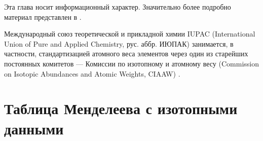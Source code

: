 \documentclass[a5paper,openany]{book}
\begin{document}
	Эта глава носит информационный характер. Значительно более подробно материал представлен в  \cite{InteIsotopes2023}.

Международный союз теоретической  и прикладной химии IUPAC (International Union of Pure and Applied Chemistry, рус. аббр. ИЮПАК) занимается, в частности, стандартизацией атомного веса элементов через один из старейших постоянных комитетов --- Комиссии по изотопному и атомному весу (Commission on Isotopic Abundances and Atomic Weights, CIAAW) \cite{CIAAW}.



\section{Таблица Менделеева с изотопными данными}
\end{document}
